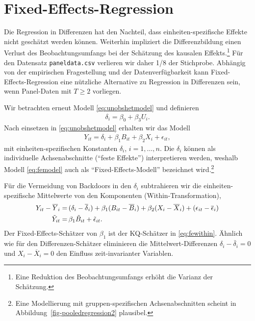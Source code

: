 \documentclass[
  a4paper,
  DIV=11,
  oneside]{scrreprt}
\begin{document}
\section{Fixed-Effects-Regression}\label{fixed-effects-regression}

Die Regression in Differenzen hat den Nachteil, dass
einheiten-spezifische Effekte nicht geschätzt werden können. Weiterhin
impliziert die Differenzbildung einen Verlust des Beobachtungsumfangs
bei der Schätzung des kausalen Effekts.\footnote{Eine Reduktion des
  Beobachtungsumfangs erhöht die Varianz der Schätzung.} Für den
Datensatz \texttt{paneldata.csv} verlieren wir daher 1/8 der Stichprobe.
Abhängig von der empirischen Fragestellung und der Datenverfügbarkeit
kann Fixed-Effects-Regression eine nützliche Alternative zu Regression
in Differenzen sein, wenn Panel-Daten mit \(T\geq2\) vorliegen.

Wir betrachten erneut Modell \eqref{eq:unobshetmodel} und definieren
\begin{align*}
  \delta_i = \beta_0 + \beta_3 U_i.
\end{align*} Nach einsetzen in \eqref{eq:unobshetmodel} erhalten wir das
Modell \begin{align}
  Y_{it} = \delta_i + \beta_1 B_{it} + \beta_2 X_i + \epsilon_{it} \label{eq:femodel},
\end{align} mit einheiten-spezifischen Konstanten \(\delta_i\),
\(i=1,\dots,n\). Die \(\delta_i\) können als individuelle
Achsenabschnitte (``feste Effekte'') interpretieren werden, weshalb
Modell \eqref{eq:femodel} auch als ``Fixed-Effects-Modell'' bezeichnet
wird.\footnote{Eine Modellierung mit gruppen-spezifischen
  Achsenabschnitten scheint in Abbildung~\ref{fig-pooledregression2}
  plausibel.}

Für die Vermeidung von Backdoors in den \(\delta_i\) subtrahieren wir
die einheiten-spezifische Mittelwerte von den Komponenten
(Within-Transformation), \begin{align}
  Y_{it} - \overline{Y}_i =&\, (\delta_i - \overline{\delta}_i) + \beta_1 (B_{it} - \overline{B}_i) + \beta_2 (X_i - \overline{X}_i) + (\epsilon_{it} - \overline{\epsilon}_i)\notag\\
  \tilde Y_{it} =&\, \beta_1 \tilde B_{it} + \tilde\epsilon_{it}.\label{eq:fewithin}
\end{align} Der Fixed-Effects-Schätzer von \(\beta_1\) ist der
KQ-Schätzer in \eqref{eq:fewithin}. Ähnlich wie für den
Differenzen-Schätzer eliminieren die Mittelwert-Differenzen
\(\delta_i - \overline{\delta}_i=0\) und \(X_i - \overline{X}_i=0\) den
Einfluss zeit-invarianter Variablen.
\end{document}
